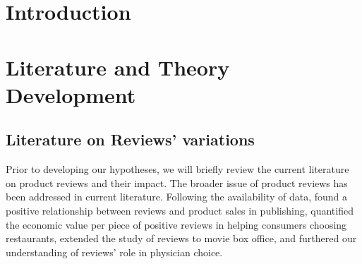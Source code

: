 \documentclass[mnsc,blindrev]{informs3} %
\begin{document}
%


\section{Introduction}
\section{Literature and Theory Development }
 
\subsection{Literature on Reviews' variations    }
Prior to developing our hypotheses, we will briefly review the current literature on product reviews and their impact.  
The broader issue of product reviews has been addressed in current literature. Following the availability of data,  \cite{chevalier2006effect} found a positive relationship between reviews and product sales in publishing, \cite{wu2015economic} quantified the economic value per piece of positive reviews in helping consumers choosing restaurants, \cite{chintagunta2010effects} extended the study of reviews to movie box office, and \cite{xu2016interplay} furthered our understanding of reviews' role in physician choice. 
\end{document}
